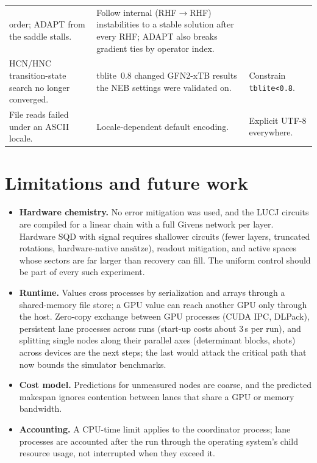 \documentclass[10pt]{article}
\newcommand{\code}[1]{\texttt{#1}}
\begin{document}
\begin{table}[p]
\begin{tabular}{>{\raggedright\arraybackslash}p{}>{\raggedright\arraybackslash}p{}>{\raggedright\arraybackslash}p{}}
order; ADAPT from the saddle stalls. &
Follow internal (RHF$\to$RHF) instabilities to a stable solution after every RHF;
ADAPT also breaks gradient ties by operator index. \\
HCN/HNC transition-state search no longer converged. &
tblite~0.8 changed GFN2-xTB results the NEB settings were validated on. &
Constrain \code{tblite<0.8}. \\
File reads failed under an ASCII locale. & Locale-dependent default encoding. &
Explicit UTF-8 everywhere. \\
\bottomrule
\end{tabular}
\end{table}

\section{Limitations and future work}

\begin{itemize}
\item \textbf{Hardware chemistry.} No error mitigation was used, and the LUCJ circuits
are compiled for a linear chain with a full Givens network per layer. Hardware SQD with
signal requires shallower circuits (fewer layers, truncated rotations,
hardware-native ans\"atze), readout mitigation, and active spaces whose sectors are far
larger than recovery can fill. The uniform control should be part of every such
experiment.
\item \textbf{Runtime.} Values cross processes by serialization and arrays through a
shared-memory file store; a GPU value can reach another GPU only through the host. Zero-copy
exchange between GPU processes (CUDA IPC, DLPack), persistent lane processes across runs
(start-up costs about 3\,s per run), and splitting single nodes along their parallel axes
(determinant blocks, shots) across devices are the next steps; the last would attack the
critical path that now bounds the simulator benchmarks.
\item \textbf{Cost model.} Predictions for unmeasured nodes are coarse, and the
predicted makespan ignores contention between lanes that share a GPU or memory
bandwidth.
\item \textbf{Accounting.} A CPU-time limit applies to the coordinator process;
lane processes are accounted after the run through the operating system's child
resource usage, not interrupted when they exceed it.
\end{itemize}
\end{document}
